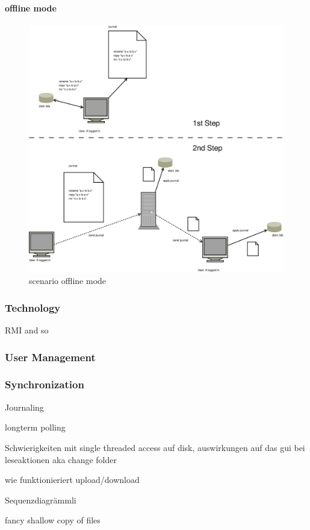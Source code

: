\paragraph{offline mode}

\begin{figure}[h!]
\centering
\includegraphics[width=1\textwidth]{figures/scenario_offline_mode.eps}
\caption{scenario offline mode}
\label{fig:scenario_offline_mode}
\end{figure}

\subsubsection{Technology}
RMI and so
\subsubsection{User Management}
\subsubsection{Synchronization}


Journaling

longterm polling

Schwierigkeiten mit single threaded access auf disk, auswirkungen auf das gui bei leseaktionen aka change folder


wie funktionieriert upload/download

Sequenzdiagrämmli

 fancy shallow copy of files